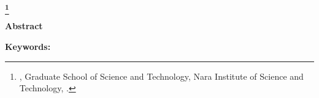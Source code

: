 \begin{center}
     \renewcommand{\thefootnote}{\fnsymbol{footnote}}
     \Large\bfseries \etitle\footnote[1]
                {{\edoctitle}, %
                Graduate School of Science and \mbox{Technology,}
                Nara Institute of Science and Technology,
                {\edate}.}
        \renewcommand{\thefootnote}{\arabic{footnote}}
\end{center}
\vspace*{1truemm}
\begin{center}
        \large\eauthor
\end{center}
\vspace*{10truemm}
\begin{center}
\textbf{Abstract}
\end{center}
\vspace*{2truemm}
\par
\eabstract
\vspace*{5truemm}
\begin{flushleft}
         \textbf{Keywords:}
\end{flushleft}
\ekeywords
